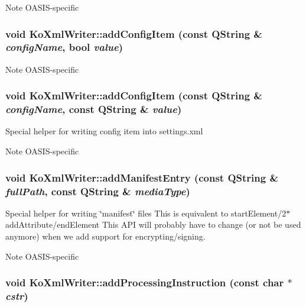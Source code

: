\label{classKoXmlWriter_a14522a8ea1c3b25e299319653ba9af9e}
\begin{DoxyNote}{Note}
OASIS-\/specific 
\end{DoxyNote}
\hypertarget{classKoXmlWriter_a2d1cc2de755ca456ca0f5bd8d81414ce}{
\subsubsection[{addConfigItem}]{\setlength{\rightskip}{0pt plus 5cm}void KoXmlWriter::addConfigItem (const QString \& {\em configName}, \/  bool {\em value})}}
\label{classKoXmlWriter_a2d1cc2de755ca456ca0f5bd8d81414ce}
\begin{DoxyNote}{Note}
OASIS-\/specific 
\end{DoxyNote}
\hypertarget{classKoXmlWriter_aedfa20fc47c415db42871b8ff0d97e8d}{
\subsubsection[{addConfigItem}]{\setlength{\rightskip}{0pt plus 5cm}void KoXmlWriter::addConfigItem (const QString \& {\em configName}, \/  const QString \& {\em value})}}
\label{classKoXmlWriter_aedfa20fc47c415db42871b8ff0d97e8d}
Special helper for writing config item into settings.xml \begin{DoxyNote}{Note}
OASIS-\/specific 
\end{DoxyNote}
\hypertarget{classKoXmlWriter_a168885626dde5e2432e9a2789b70715a}{
\subsubsection[{addManifestEntry}]{\setlength{\rightskip}{0pt plus 5cm}void KoXmlWriter::addManifestEntry (const QString \& {\em fullPath}, \/  const QString \& {\em mediaType})}}
\label{classKoXmlWriter_a168885626dde5e2432e9a2789b70715a}
Special helper for writing \char`\"{}manifest\char`\"{} files This is equivalent to startElement/2$\ast$addAttribute/endElement This API will probably have to change (or not be used anymore) when we add support for encrypting/signing. \begin{DoxyNote}{Note}
OASIS-\/specific 
\end{DoxyNote}
\hypertarget{classKoXmlWriter_aded4a15ee74b3dbd14cd0965d1ee471f}{
\subsubsection[{addProcessingInstruction}]{\setlength{\rightskip}{0pt plus 5cm}void KoXmlWriter::addProcessingInstruction (const char $\ast$ {\em cstr})}}
\label{classKoXmlWriter_aded4a15ee74b3dbd14cd0965d1ee471f}


